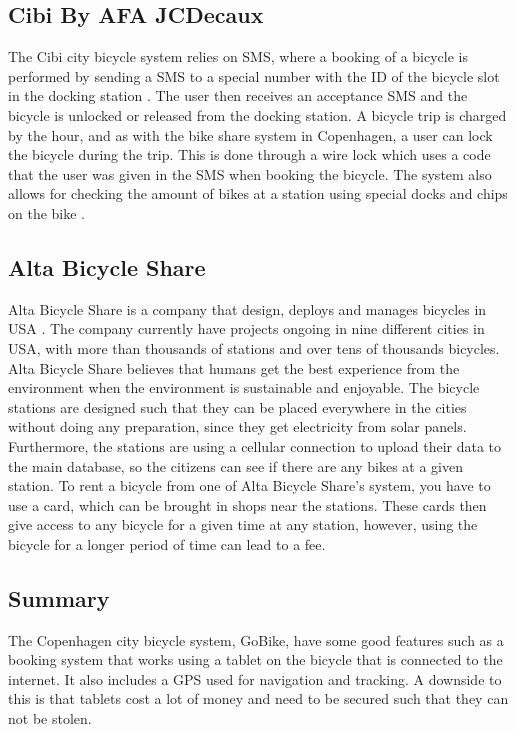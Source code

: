 \subsection{Cibi By AFA JCDecaux}
The Cibi city bicycle system relies on SMS, where a booking of a bicycle is performed by sending a SMS to a special number with the ID of the bicycle slot in the docking station \citep{misc:cibi}. 
The user then receives an acceptance SMS and the bicycle is unlocked or released from the docking station. 
A bicycle trip is charged by the hour, and as with the bike share system in Copenhagen, a user can lock the bicycle during the trip. 
This is done through a wire lock which uses a code that the user was given in the SMS when booking the bicycle.
The system also allows for checking the amount of bikes at a station using special docks and chips on the bike \citep{misc:omcibi}.

\subsection{Alta Bicycle Share}
Alta Bicycle Share is a company that design, deploys and manages bicycles in USA \citep{misc:AltaBicycleShare}.
The company currently have projects ongoing in nine different cities in USA, with more than thousands of stations and over tens of thousands bicycles. 
Alta Bicycle Share believes that humans get the best experience from the environment when the environment is sustainable and enjoyable.
The bicycle stations are designed such that they can be placed everywhere in the cities without doing any preparation, since they get electricity from solar panels.
Furthermore, the stations are using a cellular connection to upload their data to the main database, so the citizens can see if there are any bikes at a given station.
To rent a bicycle from one of Alta Bicycle Share's system, you have to use a card, which can be brought in shops near the stations.
These cards then give access to any bicycle for a given time at any station, however, using the bicycle for a longer period of time can lead to a fee.

\subsection{Summary}
The Copenhagen city bicycle system, GoBike, have some good features such as a booking system that works using a tablet on the bicycle that is connected to the internet.
It also includes a GPS used for navigation and tracking.
A downside to this is that tablets cost a lot of money and need to be secured such that they can not be stolen. 

